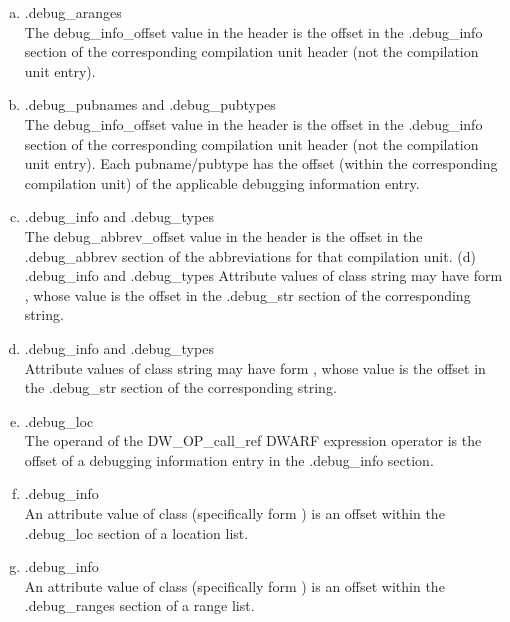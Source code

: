 \clearpage
\begin{enumerate}[(a)]  
\item  .debug\_aranges  \\
The debug\_info\_offset value in
the header is the offset in the .debug\_info section of the
corresponding compilation unit header (not the compilation
unit entry).

\item .debug\_pubnames and .debug\_pubtypes \\
The debug\_info\_offset value in the header is the offset in the
.debug\_info section of the corresponding compilation unit header (not
the compilation unit entry). Each pubname/pubtype has the offset (within
the corresponding compilation unit) of the applicable debugging
information entry.

\item .debug\_info and .debug\_types \\
The debug\_abbrev\_offset value in the header is the offset in the
.debug\_abbrev section of the abbreviations for that compilation unit.
(d) .debug\_info and .debug\_types
Attribute values of class string may have form , whose
value is the offset in the .debug\_str section of the corresponding string.

\item  .debug\_info and .debug\_types \\
Attribute values of class string may have form , whose
value is the offset in the .debug\_str section of the corresponding string.

\item .debug\_loc \\
The operand of the DW\-\_OP\-\_call\-\_ref DWARF expression operator is the
offset of a debugging information entry in the .debug\_info section.

\item .debug\_info \\
An attribute value of class  (specifically form
) is an offset within the .debug\_loc section of a
location list.

\item .debug\_info \\
An attribute value of class  (specifically form
) is an offset within the .debug\_ranges section of
a range list.



\end{enumerate}
